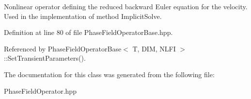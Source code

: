 Nonlinear operator defining the reduced backward Euler equation for the velocity. Used in the implementation of method Implicit\+Solve. 

Definition at line 80 of file Phase\+Field\+Operator\+Base.\+hpp.



Referenced by Phase\+Field\+Operator\+Base$<$ T, D\+I\+M, N\+L\+F\+I $>$\+::\+Set\+Transient\+Parameters().



The documentation for this class was generated from the following file\+:\begin{DoxyCompactItemize}
\item 
Phase\+Field\+Operator.\+hpp\end{DoxyCompactItemize}
